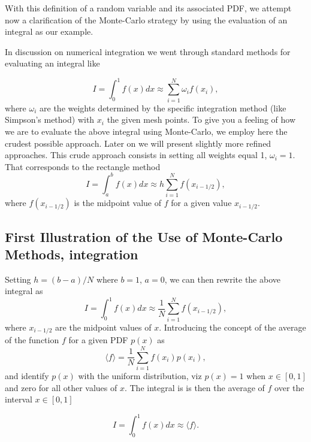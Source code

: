 \documentclass[%
oneside,                 %
final,                   %
10pt]{article}
\newenvironment{block_mdfboxadmon}[1][]{
\begin{block_mdfboxmdframed}[frametitle=#1]
}
{
\end{block_mdfboxmdframed}
}
\begin{document}
\begin{block_mdfboxadmon}[]
With this definition of a random variable and its associated PDF, 
we attempt now a clarification of the Monte-Carlo strategy by using the 
evaluation of an integral
as our example. 

In discussion on numerical integration  we went through standard methods for evaluating an integral like

\begin{equation*}
   I=\int_0^1 f(x)dx\approx \sum_{i=1}^N\omega_if(x_i),
\end{equation*}
where $\omega_i$ are the weights determined by the specific integration method  
(like Simpson's method) with $x_i$ the given mesh points. 
To give you a feeling of how we are to evaluate the above integral using Monte-Carlo,
we employ here the crudest possible approach. Later on we will present
slightly more refined approaches.
This crude approach consists in setting all weights equal 1, $\omega_i=1$.  That corresponds to the 
rectangle method
\begin{equation*}
   I=\int_a^bf(x) dx \approx  h\sum_{i=1}^N f(x_{i-1/2}), 
\end{equation*}
where $f(x_{i-1/2})$ is the midpoint value of $f$ for a  given value $x_{i-1/2}$.
\end{block_mdfboxadmon} %



\subsection{First Illustration of the Use of Monte-Carlo Methods, integration}

\begin{block_mdfboxadmon}[]
Setting $h=(b-a)/N$ where $b=1$, $a=0$, we can then rewrite the above integral as
\begin{equation*}
   I=\int_0^1 f(x)dx\approx \frac{1}{N}\sum_{i=1}^Nf(x_{i-1/2}),
\end{equation*}
where $x_{i-1/2}$ are the midpoint values of $x$.
Introducing the concept of the average of the function $f$ for a given PDF $p(x)$ as
\begin{equation*}
   \langle f \rangle = \frac{1}{N}\sum_{i=1}^Nf(x_i)p(x_i),
\end{equation*}
and identify $p(x)$ with the uniform distribution, viz
$ p(x)=1$ when $x\in [0,1]$ and zero for all other values of $x$.
The integral is 
is then  the average of $f$ over the interval $x \in [0,1]$

\begin{equation*}
      I=\int_0^1 f(x)dx\approx \langle f \rangle. 
\end{equation*}
\end{block_mdfboxadmon} %
\end{document}

